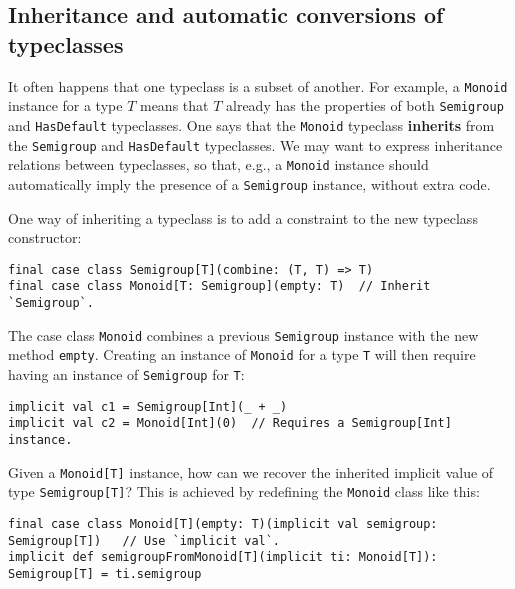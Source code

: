 \subsection{Inheritance and automatic conversions of typeclasses\label{subsec:Inheritance-and-automatic-typeclass}}

It often happens that one typeclass is a subset of another. For example,
a \lstinline!Monoid! instance for a type $T$ means that $T$ already
has the properties of both \lstinline!Semigroup! and \lstinline!HasDefault!
typeclasses. One says that the \lstinline!Monoid! typeclass \textbf{inherits}
from the \lstinline!Semigroup! and \lstinline!HasDefault! typeclasses.
We may want to express inheritance relations between typeclasses,
so that, e.g., a \lstinline!Monoid! instance should automatically
imply the presence of a \lstinline!Semigroup! instance, without extra
code.

One way of inheriting a typeclass is to add a constraint to the new
typeclass constructor:
\begin{lstlisting}
final case class Semigroup[T](combine: (T, T) => T)
final case class Monoid[T: Semigroup](empty: T)  // Inherit `Semigroup`.
\end{lstlisting}
The case class \lstinline!Monoid! combines a previous \lstinline!Semigroup!
instance with the new method \lstinline!empty!. Creating an instance
of \lstinline!Monoid! for a type \lstinline!T! will then require
having an instance of \lstinline!Semigroup! for \lstinline!T!:
\begin{lstlisting}
implicit val c1 = Semigroup[Int](_ + _)
implicit val c2 = Monoid[Int](0)  // Requires a Semigroup[Int] instance.
\end{lstlisting}

Given a \lstinline!Monoid[T]! instance, how can we recover the inherited
implicit value of type \lstinline!Semigroup[T]!? This is achieved
by redefining the \lstinline!Monoid! class like this:
\begin{lstlisting}
final case class Monoid[T](empty: T)(implicit val semigroup: Semigroup[T])   // Use `implicit val`.
implicit def semigroupFromMonoid[T](implicit ti: Monoid[T]): Semigroup[T] = ti.semigroup
\end{lstlisting}

